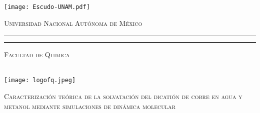 
\begin{titlepage}
    \thispagestyle{empty}
    \begin{minipage}[c][0.17\textheight][c]{0.25\textwidth}
        \begin{center}
            \texttt{[image: Escudo-UNAM.pdf]}
        \end{center}
    \end{minipage}
    \begin{minipage}[c][0.195\textheight][t]{0.75\textwidth}
        \begin{center}
            \vspace{0.3cm}
            \textsc{\large Universidad Nacional Aut\'onoma de M\'exico}\\[0.5cm]
            \vspace{0.3cm}
            \hrule height2.5pt
            \vspace{.2cm}
            \hrule height1pt
            \vspace{.8cm}
            \textsc{Facultad de Química}\\[0.5cm] %
        \end{center}
    \end{minipage}

    \begin{minipage}[c][0.81\textheight][t]{0.25\textwidth}
        \vspace*{5mm}
        \begin{center}
            \hskip2.0mm
            \vrule width1pt height13cm 
            \vspace{5mm}
            \hskip2pt
            \vrule width2.5pt height13cm
            \hskip2mm
            \vrule width1pt height13cm \\
            \vspace{5mm}
            \texttt{[image: logofq.jpeg]}
        \end{center}
    \end{minipage}
    \begin{minipage}[c][0.81\textheight][t]{0.75\textwidth}
        \begin{center}
            \vspace{1cm}

            {\large\scshape Caracterización teórica de la solvatación del dicatión de cobre en agua y metanol mediante simulaciones de dinámica molecular}\\[.2in]

            \vspace{2cm}            


\end{center}
\end{minipage}
\end{titlepage}
